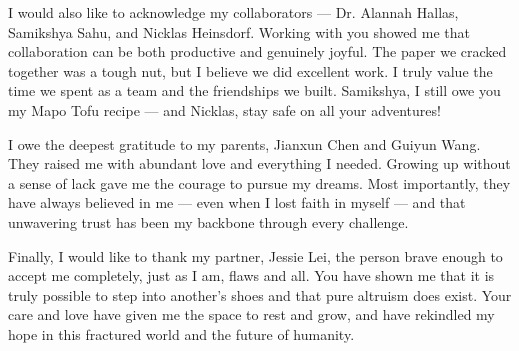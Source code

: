 I would also like to acknowledge my collaborators — Dr. Alannah Hallas, Samikshya Sahu, and Nicklas Heinsdorf. Working with you showed me that collaboration can be both productive and genuinely joyful. The paper we cracked together was a tough nut, but I believe we did excellent work. I truly value the time we spent as a team and the friendships we built. Samikshya, I still owe you my Mapo Tofu recipe — and Nicklas, stay safe on all your adventures!

I owe the deepest gratitude to my parents, Jianxun Chen and Guiyun Wang. They raised me with abundant love and everything I needed. Growing up without a sense of lack gave me the courage to pursue my dreams. Most importantly, they have always believed in me — even when I lost faith in myself — and that unwavering trust has been my backbone through every challenge.

Finally, I would like to thank my partner, Jessie Lei, the person brave enough to accept me completely, just as I am, flaws and all. You have shown me that it is truly possible to step into another’s shoes and that pure altruism does exist. Your care and love have given me the space to rest and grow, and have rekindled my hope in this fractured world and the future of humanity. 
